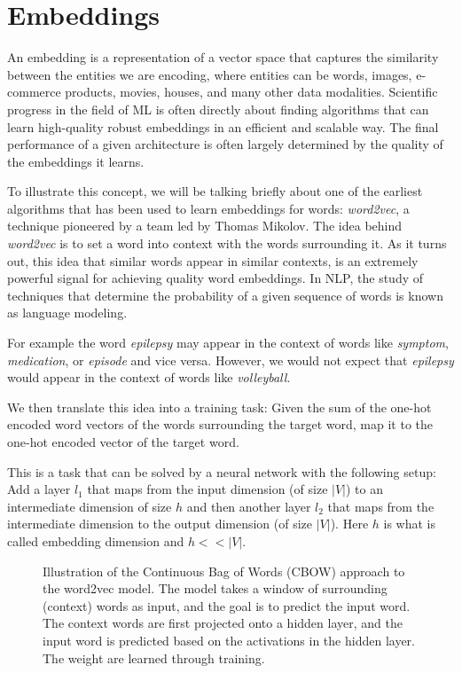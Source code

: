 \section{Embeddings}
\label{embeddings}
An embedding is a representation of a vector space that captures the similarity between the entities we are encoding, where entities can be words, images, e-commerce products, movies, houses, and many other data modalities.
Scientific progress in the field of ML is often directly about finding algorithms that can learn high-quality robust embeddings in an efficient and scalable way. The final performance of a given architecture is often largely determined by the quality of the embeddings it learns.

To illustrate this concept, we will be talking briefly about one of the earliest algorithms that has been used to learn embeddings for words: \textit{word2vec}, a technique pioneered by a team led by Thomas Mikolov.\cite{https://doi.org/10.48550/arxiv.1301.3781}
The idea behind \textit{word2vec} is to set a word into context with the words surrounding it. As it turns out, this idea that similar words appear in similar contexts, is an extremely powerful signal for achieving quality word embeddings. In NLP, the study of techniques that determine the probability of a given sequence of words is known as language modeling.

For example the word \textit{epilepsy} may appear in the context of words like \textit{symptom}, \textit{medication}, or \textit{episode} and vice versa.
However, we would not expect that \textit{epilepsy} would appear in the context of words like \textit{volleyball}.

We then translate this idea into a training task:
Given the sum of the one-hot encoded word vectors of the words surrounding the target word, map it to the one-hot encoded vector of the target word.

This is a task that can be solved by a neural network with the following setup:
Add a layer $l_1$ that maps from the input dimension (of size $|V|$) to an intermediate dimension of size $h$ and then another layer $l_2$ that maps from the intermediate dimension to the output dimension (of size $|V|$).
Here $h$ is what is called embedding dimension and $h << |V|$.

\begin{figure}
  
  \caption{Illustration of the Continuous Bag of Words (CBOW) approach to the word2vec model. The model takes a window of surrounding (context) words as input, and the goal is to predict the input word. The context words are first projected onto a hidden layer, and the input word is predicted based on the activations in the hidden layer. The weight are learned through training.}
  \label{fig:word2vec_cbow}
\end{figure}

